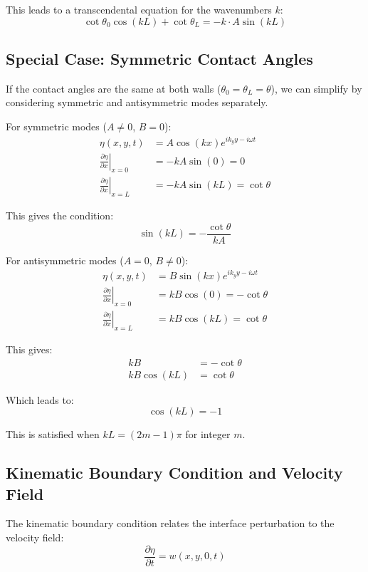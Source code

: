 \documentclass[12pt,a4paper]{article}
\begin{document}
This leads to a transcendental equation for the wavenumbers $k$:
\begin{equation}
\cot\theta_0\cos(kL) + \cot\theta_L = -k\cdot A\sin(kL)
\end{equation}

\subsection{Special Case: Symmetric Contact Angles}
If the contact angles are the same at both walls ($\theta_0 = \theta_L = \theta$), we can simplify by considering symmetric and antisymmetric modes separately.

For symmetric modes ($A \neq 0$, $B = 0$):
\begin{align}
\eta(x,y,t) &= A\cos(kx)e^{ik_y y - i\omega t} \\
\left.\frac{\partial \eta}{\partial x}\right|_{x=0} &= -kA\sin(0) = 0 \\
\left.\frac{\partial \eta}{\partial x}\right|_{x=L} &= -kA\sin(kL) = \cot\theta
\end{align}

This gives the condition:
\begin{equation}
\sin(kL) = -\frac{\cot\theta}{kA}
\end{equation}

For antisymmetric modes ($A = 0$, $B \neq 0$):
\begin{align}
\eta(x,y,t) &= B\sin(kx)e^{ik_y y - i\omega t} \\
\left.\frac{\partial \eta}{\partial x}\right|_{x=0} &= kB\cos(0) = -\cot\theta \\
\left.\frac{\partial \eta}{\partial x}\right|_{x=L} &= kB\cos(kL) = \cot\theta
\end{align}

This gives:
\begin{align}
kB &= -\cot\theta \\
kB\cos(kL) &= \cot\theta
\end{align}

Which leads to:
\begin{equation}
\cos(kL) = -1
\end{equation}

This is satisfied when $kL = (2m-1)\pi$ for integer $m$.

\subsection{Kinematic Boundary Condition and Velocity Field}
The kinematic boundary condition relates the interface perturbation to the velocity field:
\begin{equation}
\frac{\partial \eta}{\partial t} = w(x,y,0,t)
\end{equation}
\end{document}
